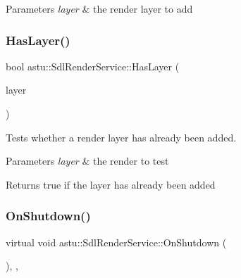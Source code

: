 \begin{DoxyParams}{Parameters}
{\em layer} & the render layer to add \\
\hline
\end{DoxyParams}
\mbox{\label{classastu_1_1SdlRenderService_a45016463f301b52b1ffacfa976eb9849}} 
\subsubsection{\texorpdfstring{Has\+Layer()}{HasLayer()}}
{\footnotesize\ttfamily bool astu\+::\+Sdl\+Render\+Service\+::\+Has\+Layer (\begin{DoxyParamCaption}\item[{std\+::shared\+\_\+ptr$<$ \hyperlink{classastu_1_1ISdlRenderLayer}{I\+Sdl\+Render\+Layer} $>$}]{layer }\end{DoxyParamCaption})}

Tests whether a render layer has already been added.


\begin{DoxyParams}{Parameters}
{\em layer} & the render to test \\
\hline
\end{DoxyParams}
\begin{DoxyReturn}{Returns}
{\ttfamily true} if the layer has already been added 
\end{DoxyReturn}
\mbox{\label{classastu_1_1SdlRenderService_a4f21478ca10de11d260792c3ccd79eef}} 
\subsubsection{\texorpdfstring{On\+Shutdown()}{OnShutdown()}}
{\footnotesize\ttfamily virtual void astu\+::\+Sdl\+Render\+Service\+::\+On\+Shutdown (\begin{DoxyParamCaption}{ }\end{DoxyParamCaption})\hspace{0.3cm}{\ttfamily [override]}, {\ttfamily [protected]}, {\ttfamily [virtual]}}

